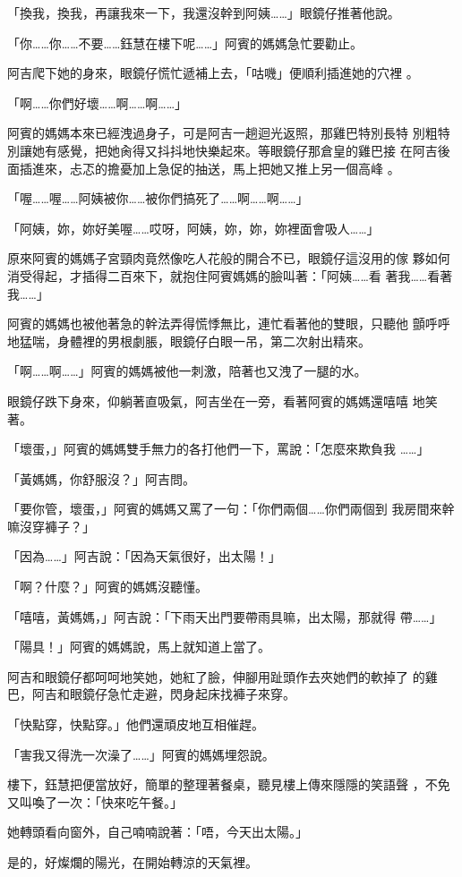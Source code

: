 「換我，換我，再讓我來一下，我還沒幹到阿姨……」眼鏡仔推著他說。

「你……你……不要……鈺慧在樓下呢……」阿賓的媽媽急忙要勸止。

阿吉爬下她的身來，眼鏡仔慌忙遞補上去，「咕嘰」便順利插進她的穴裡
。

「啊……你們好壞……啊……啊……」

阿賓的媽媽本來已經洩過身子，可是阿吉一趟迴光返照，那雞巴特別長特
別粗特別讓她有感覺，把她肏得又抖抖地快樂起來。等眼鏡仔那倉皇的雞巴接
在阿吉後面插進來，忐忑的擔憂加上急促的抽送，馬上把她又推上另一個高峰
。

「喔……喔……阿姨被你……被你們搞死了……啊……啊……」

「阿姨，妳，妳好美喔……哎呀，阿姨，妳，妳，妳裡面會吸人……」

原來阿賓的媽媽子宮頸肉竟然像吃人花般的開合不已，眼鏡仔這沒用的傢
夥如何消受得起，才插得二百來下，就抱住阿賓媽媽的臉叫著：「阿姨……看
著我……看著我……」

阿賓的媽媽也被他著急的幹法弄得慌悸無比，連忙看著他的雙眼，只聽他
顫呼呼地猛喘，身體裡的男根劇脹，眼鏡仔白眼一吊，第二次射出精來。

「啊……啊……」阿賓的媽媽被他一刺激，陪著也又洩了一腿的水。

眼鏡仔跌下身來，仰躺著直吸氣，阿吉坐在一旁，看著阿賓的媽媽還嘻嘻
地笑著。

「壞蛋，」阿賓的媽媽雙手無力的各打他們一下，罵說：「怎麼來欺負我
……」

「黃媽媽，你舒服沒？」阿吉問。

「要你管，壞蛋，」阿賓的媽媽又罵了一句：「你們兩個……你們兩個到
我房間來幹嘛沒穿褲子？」

「因為……」阿吉說：「因為天氣很好，出太陽！」

「啊？什麼？」阿賓的媽媽沒聽懂。

「嘻嘻，黃媽媽，」阿吉說：「下雨天出門要帶雨具嘛，出太陽，那就得
帶……」

「陽具！」阿賓的媽媽說，馬上就知道上當了。

阿吉和眼鏡仔都呵呵地笑她，她紅了臉，伸腳用趾頭作去夾她們的軟掉了
的雞巴，阿吉和眼鏡仔急忙走避，閃身起床找褲子來穿。

「快點穿，快點穿。」他們還頑皮地互相催趕。

「害我又得洗一次澡了……」阿賓的媽媽埋怨說。

樓下，鈺慧把便當放好，簡單的整理著餐桌，聽見樓上傳來隱隱的笑語聲
，不免又叫喚了一次：「快來吃午餐。」

她轉頭看向窗外，自己喃喃說著：「唔，今天出太陽。」

是的，好燦爛的陽光，在開始轉涼的天氣裡。










